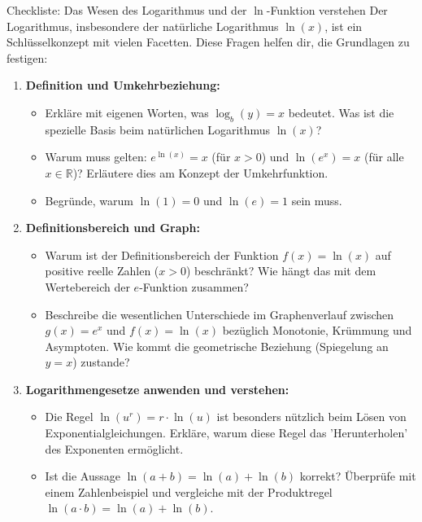 \begin{aufgabenumgebung}{Checkliste: Das Wesen des Logarithmus und der $\ln$-Funktion verstehen}
Der Logarithmus, insbesondere der natürliche Logarithmus $\ln(x)$, ist ein Schlüsselkonzept mit vielen Facetten. Diese Fragen helfen dir, die Grundlagen zu festigen:

\begin{enumerate}[label=(\alph*)]
    \item \textbf{Definition und Umkehrbeziehung:}
    \begin{itemize}
        \item Erkläre mit eigenen Worten, was $\log_b(y)=x$ bedeutet. Was ist die spezielle Basis beim natürlichen Logarithmus $\ln(x)$?
        \item Warum muss gelten: $e^{\ln(x)} = x$ (für $x>0$) und $\ln(e^x) = x$ (für alle $x \in \mathbb{R}$)? Erläutere dies am Konzept der Umkehrfunktion.
        \item Begründe, warum $\ln(1)=0$ und $\ln(e)=1$ sein muss.
    \end{itemize}
    \item \textbf{Definitionsbereich und Graph:}
    \begin{itemize}
        \item Warum ist der Definitionsbereich der Funktion $f(x)=\ln(x)$ auf positive reelle Zahlen ($x>0$) beschränkt? Wie hängt das mit dem Wertebereich der $e$-Funktion zusammen?
        \item Beschreibe die wesentlichen Unterschiede im Graphenverlauf zwischen $g(x)=e^x$ und $f(x)=\ln(x)$ bezüglich Monotonie, Krümmung und Asymptoten. Wie kommt die geometrische Beziehung (Spiegelung an $y=x$) zustande?
    \end{itemize}
    \item \textbf{Logarithmengesetze anwenden und verstehen:}
    \begin{itemize}
        \item Die Regel $\ln(u^r) = r \cdot \ln(u)$ ist besonders nützlich beim Lösen von Exponentialgleichungen. Erkläre, warum diese Regel das 'Herunterholen' des Exponenten ermöglicht.
        \item Ist die Aussage $\ln(a+b) = \ln(a) + \ln(b)$ korrekt? Überprüfe mit einem Zahlenbeispiel und vergleiche mit der Produktregel $\ln(a \cdot b) = \ln(a) + \ln(b)$.
    \end{itemize}
\end{enumerate}
\end{aufgabenumgebung}

